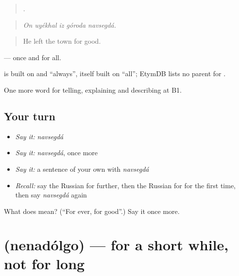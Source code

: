 \begin{quote}
    .
\end{quote}

\begin{quote}
\emph{On uyékhal iz góroda navsegdá.}
\end{quote}

\begin{quote}
He left the town for good.
\end{quote}

\emph{  } — once and for all.

\begin{cousinweb}
\emph{} is built on \emph{} and \emph{} \textquotedblleft{}always\textquotedblright{}, itself built on \emph{} \textquotedblleft{}all\textquotedblright{}; EtymDB lists no parent for \emph{}.
\end{cousinweb}

\begin{grammarlens}[title={What you've built}]
One more word for telling, explaining and describing at B1.
\end{grammarlens}

\subsection*{Your turn}
\begin{itemize}
\raggedright
  \item \emph{Say it:} \emph{navsegdá}
  \item \emph{Say it:} \emph{navsegdá}, once more
  \item \emph{Say it:} a sentence of your own with \emph{navsegdá}
  \item \emph{Recall:} say the Russian for further, then the Russian for for the first time, then say \emph{navsegdá} again
\end{itemize}

\begin{tcolorbox}[breakable,colback=teal!4,colframe=teal!35!black,title={Before you move on}]
What does  mean? (\textquotedblleft{}For ever, for good\textquotedblright{}.) Say it once more.
\end{tcolorbox}
\section[\texorpdfstring{\ru{ненадолго} (nenadólgo)}{ненадолго (nenadólgo)}]{ (nenadólgo) — for a short while, not for long}

